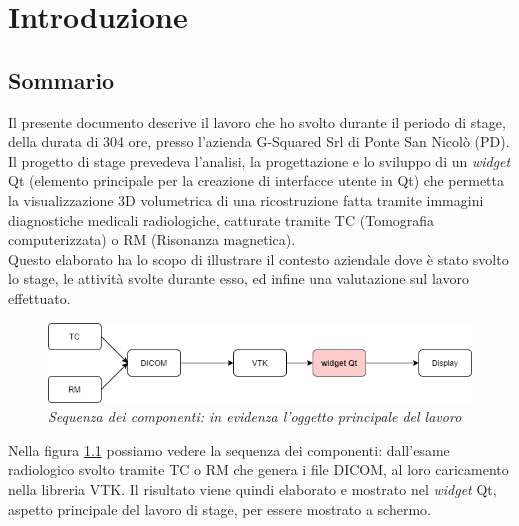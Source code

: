 
\chapter{Introduzione}
\label{cap:introduzione}

\section{Sommario}\label{sec: Sommario}

Il presente documento descrive il lavoro che ho svolto durante il periodo di stage, della durata di 304 ore, presso l'azienda G-Squared Srl di Ponte San Nicolò (PD).
\\
Il progetto di stage prevedeva l'analisi, la progettazione e lo sviluppo di un \emph{widget} Qt (elemento principale per la creazione di interfacce utente in Qt) che permetta la visualizzazione 3D volumetrica di una ricostruzione fatta tramite immagini diagnostiche medicali radiologiche, catturate tramite TC (Tomografia computerizzata) o RM (Risonanza magnetica).
\\
Questo elaborato ha lo scopo di illustrare il contesto aziendale dove è stato svolto lo stage, le attività svolte durante esso, ed infine una valutazione sul lavoro effettuato.

\begin{figure}[ht]
    \centering
    \includegraphics[width=1\textwidth]{immagini/schemainiziale.png}
    \caption{\textit{Sequenza dei componenti: in evidenza l'oggetto principale del lavoro}}
    \label{fig: Intro Scheme}
\end{figure}

Nella figura \ref{fig: Intro Scheme} possiamo vedere la sequenza dei componenti: dall'esame radiologico svolto tramite TC o RM che genera i file DICOM, al loro caricamento nella libreria VTK. Il risultato viene quindi elaborato e mostrato nel \emph{widget} Qt, aspetto principale del lavoro di stage, per essere mostrato a schermo.


